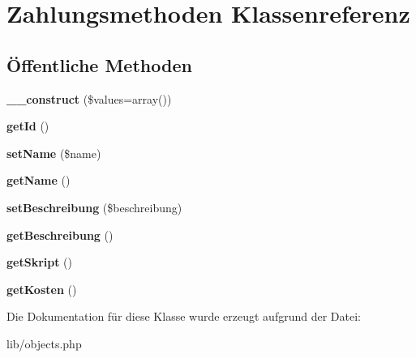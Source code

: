 \hypertarget{classZahlungsmethoden}{\section{\-Zahlungsmethoden \-Klassenreferenz}
\label{classZahlungsmethoden}
}
\subsection*{Öffentliche \-Methoden}
\begin{DoxyCompactItemize}
\item 
\hypertarget{classZahlungsmethoden_af0951bf1729ee841abbe630561017fba}{{\bfseries \-\_\-\-\_\-construct} (\$values=array())}\label{classZahlungsmethoden_af0951bf1729ee841abbe630561017fba}

\item 
\hypertarget{classZahlungsmethoden_ae0d76f1130f05fa8fbc36fbe81299515}{{\bfseries get\-Id} ()}\label{classZahlungsmethoden_ae0d76f1130f05fa8fbc36fbe81299515}

\item 
\hypertarget{classZahlungsmethoden_a4b88ed1a33fb388e80821142ed3f5075}{{\bfseries set\-Name} (\$name)}\label{classZahlungsmethoden_a4b88ed1a33fb388e80821142ed3f5075}

\item 
\hypertarget{classZahlungsmethoden_ac293e9efa518261beef99f7fe66baa7f}{{\bfseries get\-Name} ()}\label{classZahlungsmethoden_ac293e9efa518261beef99f7fe66baa7f}

\item 
\hypertarget{classZahlungsmethoden_a00260a23ec9f28434370f6099cd941f5}{{\bfseries set\-Beschreibung} (\$beschreibung)}\label{classZahlungsmethoden_a00260a23ec9f28434370f6099cd941f5}

\item 
\hypertarget{classZahlungsmethoden_a5ff345578e660aae9b8c01e777483489}{{\bfseries get\-Beschreibung} ()}\label{classZahlungsmethoden_a5ff345578e660aae9b8c01e777483489}

\item 
\hypertarget{classZahlungsmethoden_a5e9d6ee42554a7d2208858d5ac8f659a}{{\bfseries get\-Skript} ()}\label{classZahlungsmethoden_a5e9d6ee42554a7d2208858d5ac8f659a}

\item 
\hypertarget{classZahlungsmethoden_ad5a3f408c2b7a194b5b5a28952eab569}{{\bfseries get\-Kosten} ()}\label{classZahlungsmethoden_ad5a3f408c2b7a194b5b5a28952eab569}

\end{DoxyCompactItemize}


\-Die \-Dokumentation für diese \-Klasse wurde erzeugt aufgrund der \-Datei\-:\begin{DoxyCompactItemize}
\item 
lib/objects.\-php\end{DoxyCompactItemize}
